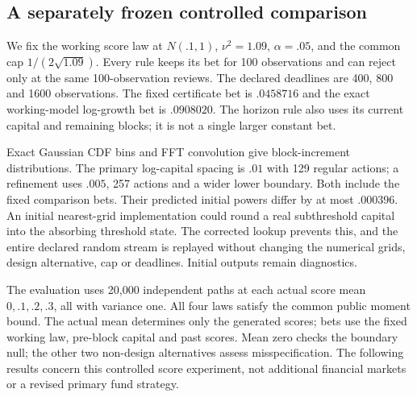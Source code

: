\subsection{A separately frozen controlled comparison}
We fix the working score law at $N(.1,1)$, $\nu^2=1.09$,
$\alpha=.05$, and the common cap $1/(2\sqrt{1.09})$. Every rule keeps its bet
for 100 observations and can reject only at the same 100-observation reviews.
The declared deadlines are 400, 800 and 1600 observations. The fixed
certificate bet is $.0458716$ and the exact working-model log-growth bet is
$.0908020$. The horizon rule also uses its current capital and remaining
blocks; it is not a single larger constant bet.

Exact Gaussian CDF bins and FFT convolution give block-increment distributions.
The primary log-capital spacing is $.01$ with 129 regular actions; a refinement
uses $.005$, 257 actions and a wider lower boundary. Both include the fixed
comparison bets. Their predicted initial powers differ by at most $.000396$.
An initial nearest-grid implementation could round a real subthreshold capital
into the absorbing threshold state. The corrected lookup prevents this, and
the entire declared random stream is replayed without changing the numerical
grids, design alternative, cap or deadlines. Initial outputs remain diagnostics.

The evaluation uses 20,000 independent paths at each actual score mean
$0,.1,.2,.3$, all with variance one. All four laws satisfy the common public
moment bound. The actual mean determines only the generated scores; bets use
the fixed working law, pre-block capital and past scores. Mean zero checks the
boundary null; the other two non-design alternatives assess misspecification.
The following results concern this controlled score experiment, not additional
financial markets or a revised primary fund strategy.




